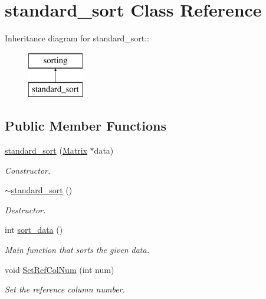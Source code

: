\hypertarget{classstandard__sort}{
\section{standard\_\-sort Class Reference}
\label{d4/dec/classstandard__sort}
}
Inheritance diagram for standard\_\-sort::\begin{figure}[H]
\begin{center}
\leavevmode
\includegraphics[height=2cm]{d4/dec/classstandard__sort}
\end{center}
\end{figure}
\subsection*{Public Member Functions}
\begin{DoxyCompactItemize}
\item 
\hyperlink{classstandard__sort_a70a7e1ba1cae2d294b252f6182f81436}{standard\_\-sort} (\hyperlink{classMatrix}{Matrix} $\ast$data)
\begin{DoxyCompactList}\small\item\em Constructor. \item\end{DoxyCompactList}\item 
\hypertarget{classstandard__sort_af40099379c12e092519a20afbad5c6b9}{
\hyperlink{classstandard__sort_af40099379c12e092519a20afbad5c6b9}{$\sim$standard\_\-sort} ()}
\label{d4/dec/classstandard__sort_af40099379c12e092519a20afbad5c6b9}

\begin{DoxyCompactList}\small\item\em Destructor. \item\end{DoxyCompactList}\item 
int \hyperlink{classstandard__sort_a34a0d914ebac6e328dfe371a1e1a8afb}{sort\_\-data} ()
\begin{DoxyCompactList}\small\item\em Main function that sorts the given data. \item\end{DoxyCompactList}\item 
\hypertarget{classstandard__sort_a5bf11721c6c6147440c68409b830a31a}{
void \hyperlink{classstandard__sort_a5bf11721c6c6147440c68409b830a31a}{SetRefColNum} (int num)}
\label{d4/dec/classstandard__sort_a5bf11721c6c6147440c68409b830a31a}

\begin{DoxyCompactList}\small\item\em Set the reference column number. \item\end{DoxyCompactList}\end{DoxyCompactItemize}


